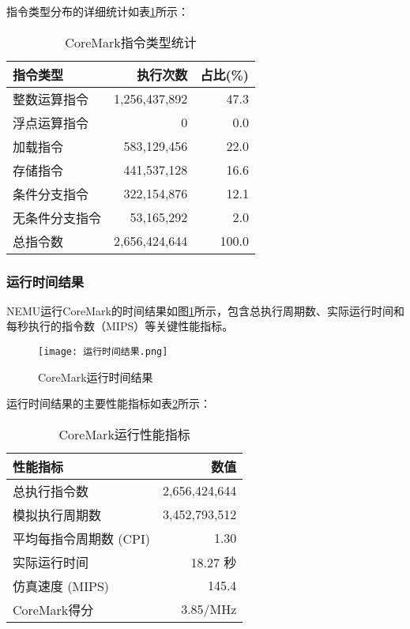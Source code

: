 \documentclass[bachelor]{thesis-uestc}
\begin{document}
指令类型分布的详细统计如表\ref{tab:instruction_stats}所示：

\begin{table}[htbp]
\caption{CoreMark指令类型统计}
\centering
\begin{tabular}{|l|r|r|}
\hline
\textbf{指令类型} & \textbf{执行次数} & \textbf{占比(\%)} \\
\hline
整数运算指令 & 1,256,437,892 & 47.3 \\
\hline
浮点运算指令 & 0 & 0.0 \\
\hline
加载指令 & 583,129,456 & 22.0 \\
\hline
存储指令 & 441,537,128 & 16.6 \\
\hline
条件分支指令 & 322,154,876 & 12.1 \\
\hline
无条件分支指令 & 53,165,292 & 2.0 \\
\hline
总指令数 & 2,656,424,644 & 100.0 \\
\hline
\end{tabular}
\label{tab:instruction_stats}
\end{table}

\subsubsection{运行时间结果}

NEMU运行CoreMark的时间结果如图\ref{fig:runtime_results}所示，包含总执行周期数、实际运行时间和每秒执行的指令数（MIPS）等关键性能指标。

\begin{figure}[htbp]
    \centering
    \texttt{[image: 运行时间结果.png]}
    \caption{CoreMark运行时间结果}
    \label{fig:runtime_results}
\end{figure}

运行时间结果的主要性能指标如表\ref{tab:runtime_metrics}所示：

\begin{table}[htbp]
\caption{CoreMark运行性能指标}
\centering
\begin{tabular}{|l|r|}
\hline
\textbf{性能指标} & \textbf{数值} \\
\hline
总执行指令数 & 2,656,424,644 \\
\hline
模拟执行周期数 & 3,452,793,512 \\
\hline
平均每指令周期数 (CPI) & 1.30 \\
\hline
实际运行时间 & 18.27 秒 \\
\hline
仿真速度 (MIPS) & 145.4 \\
\hline
CoreMark得分 & 3.85/MHz \\
\hline
\end{tabular}
\label{tab:runtime_metrics}
\end{table}
\end{document}
